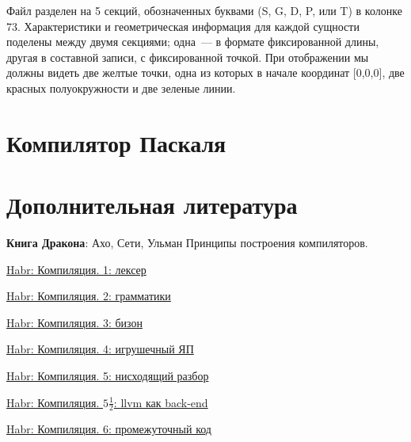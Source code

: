 Файл разделен на 5 секций, обозначенных буквами (S, G, D, P, или T) в колонке
73. Характеристики и геометрическая информация для каждой сущности поделены
между двумя секциями; одна\ --- в формате фиксированной длины, другая в составной записи, с фиксированной 
точкой. При отображении мы должны видеть
две желтые точки, одна из которых в начале координат [0,0,0], две красных полуокружности и две зеленые
линии.


\section{Компилятор Паскаля}

\section{Дополнительная литература}\label{lexlit}

\label{exdragon}\cite{dragonbook} \textbf{Книга Дракона}: Ахо, Сети, Ульман
Принципы построения компиляторов.

\bigskip

\href{http://habrahabr.ru/post/99162/}{Habr: Компиляция. 1: лексер}

\href{http://habrahabr.ru/post/99298/}{Habr: Компиляция. 2: грамматики}

\href{http://habrahabr.ru/post/99366/}{Habr: Компиляция. 3: бизон}

\href{http://habrahabr.ru/post/99397/}{Habr: Компиляция. 4: игрушечный ЯП}

\href{http://habrahabr.ru/post/99466/}{Habr: Компиляция. 5: нисходящий разбор}

\href{http://habrahabr.ru/post/102597/}{Habr: Компиляция. $5\frac{1}{2}$: llvm
как back-end}

\href{http://habrahabr.ru/post/99592/}{Habr: Компиляция. 6: промежуточный код}

